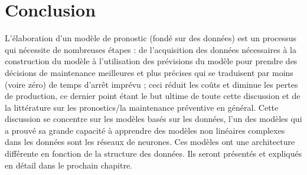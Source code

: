 \section{Conclusion}
L'élaboration d'un modèle de pronostic (fondé sur des données) est un processus qui nécessite de nombreuses étapes : de l'acquisition des données nécessaires à la construction du modèle à l'utilisation des prévisions du modèle pour prendre des décisions de maintenance meilleures et plus précises qui se traduisent par moins (voire zéro) de temps d'arrêt imprévu ; ceci réduit les coûts et diminue les pertes de production, ce dernier point étant le but ultime de toute cette discussion et de la littérature sur les pronostics/la maintenance préventive en général. Cette discussion se concentre sur les modèles basés sur les données, l'un des modèles qui a prouvé sa grande capacité à apprendre des modèles non linéaires complexes dans les données sont les réseaux de neurones. Ces modèles ont une architecture différente en fonction de la structure des données. Ils seront présentés et expliqués en détail dans le prochain chapitre.

